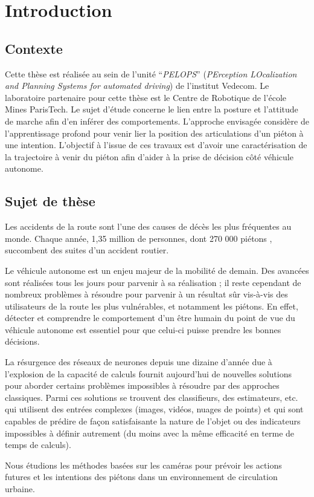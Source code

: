 \clearpage
\section{Introduction}
\label{sec:Intro}

\subsection{Contexte}
Cette thèse est réalisée au sein de l’unité “\textit{PELOPS}” (\textit{PErception LOcalization and Planning Systems for automated driving}) de l'institut Vedecom. Le laboratoire partenaire pour cette thèse est le Centre de Robotique de l'école Mines ParisTech. Le sujet d’étude concerne le lien entre la posture et l’attitude de marche afin d’en inférer des comportements. L’approche envisagée considère de l’apprentissage profond pour venir lier la position des articulations d’un piéton à une intention. L’objectif à l’issue de ces travaux est d’avoir une caractérisation de la trajectoire à venir du piéton afin d’aider à la prise de décision côté véhicule autonome.

\subsection{Sujet de thèse}
Les accidents de la route sont l'une des causes de décès les plus fréquentes au monde. Chaque année, 1,35 million de personnes, dont 270 000 piétons \cite{WinNT}, succombent des suites d'un accident routier.

Le véhicule autonome est un enjeu majeur de la mobilité de demain. Des avancées sont réalisées tous les jours pour parvenir à sa réalisation ; il reste cependant de nombreux problèmes à résoudre pour parvenir à un résultat sûr vis-à-vis des utilisateurs de la route les plus vulnérables, et notamment les piétons.
En effet, détecter et comprendre le comportement d’un être humain du point de vue du véhicule autonome est essentiel pour que celui-ci puisse prendre les bonnes décisions.

La résurgence des réseaux de neurones depuis une dizaine d’année due à l’explosion de la capacité de calculs fournit aujourd’hui de nouvelles solutions pour aborder certains problèmes impossibles à résoudre par des approches classiques. Parmi ces solutions se trouvent des classifieurs, des estimateurs, etc. qui utilisent des entrées complexes (images, vidéos, nuages de points) et qui sont capables de prédire de façon satisfaisante la nature de l’objet ou des indicateurs impossibles à définir autrement (du moins avec la même efficacité en terme de temps de calculs).

Nous étudions les méthodes basées sur les caméras pour prévoir les actions futures
et les intentions des piétons dans un environnement de circulation urbaine.












